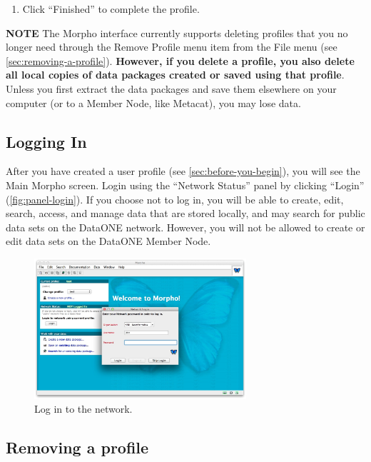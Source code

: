 \begin{enumerate}
  \item Click ``Finished'' to complete the profile.
\end{enumerate}

\begin{shaded}
  \textbf{NOTE} The Morpho interface currently supports deleting
  profiles that you no longer need through the Remove Profile menu item
  from the File menu (see \autoref{sec:removing-a-profile}).
   \textbf{However, if you delete a profile, you also
  delete all local copies of data packages created or saved using that
  profile}. Unless you first extract the data packages and save them
  elsewhere on your computer (or to a Member Node, like Metacat), you
  may lose data.
\end{shaded}

\subsection{Logging In}

After you have created a user profile (see
\autoref{sec:before-you-begin}), you will see the Main Morpho screen.
Login using the ``Network Status'' panel by clicking
``Login'' (\autoref{fig:panel-login}). If you choose not to log in, you
will be able to create, edit, search, access, and manage data that are
stored locally, and may search for public data sets on the DataONE network.
However, you will not be allowed to create or edit data sets on the DataONE
Member Node.

\begin{figure}
  \centering
    \includegraphics[width=0.7\textwidth]{images/panel-login.jpg}
  \caption{Log in to the network.}
  \label{fig:panel-login}
\end{figure}

\subsection{Removing a profile} \label{sec:removing-a-profile}

